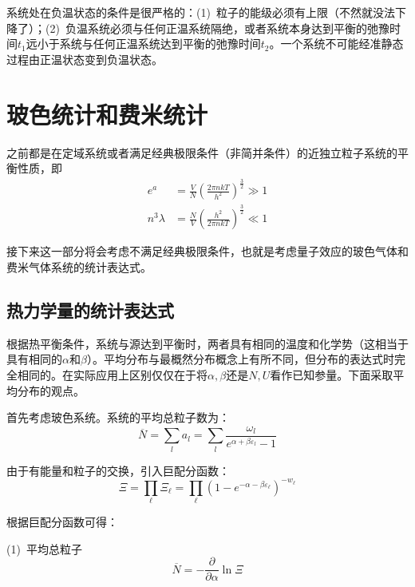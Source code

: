 \documentclass[UTF8]{ctexart}
\begin{document}
	系统处在负温状态的条件是很严格的：(1)\ 粒子的能级必须有上限（不然就没法下降了）；(2)\ 负温系统必须与任何正温系统隔绝，或者系统本身达到平衡的弛豫时间$ t_{1} $远小于系统与任何正温系统达到平衡的弛豫时间$ t_{2} $。一个系统不可能经准静态过程由正温状态变到负温状态。 

	\section{玻色统计和费米统计}
	之前都是在定域系统或者满足经典极限条件（非简并条件）的近独立粒子系统的平衡性质，即
	\begin{equation}
	\begin{aligned}
	e^{a}&=\frac{V}{N}\left(\frac{2 \pi n k T}{h^{2}}\right)^{\frac{3}{2}} \gg 1\\
	n^{3} \lambda& = \frac{N}{V} \left(\frac{h^{2}}{2 \pi n k T}\right)^{\frac{3}{2}} \ll 1
   	\end{aligned}
	\end{equation}

	接下来这一部分将会考虑不满足经典极限条件，也就是考虑量子效应的玻色气体和费米气体系统的统计表达式。

	\subsection{热力学量的统计表达式}
	根据热平衡条件，系统与源达到平衡时，两者具有相同的温度和化学势（这相当于具有相同的$ \alpha $和$ \beta $）。平均分布与最概然分布概念上有所不同，但分布的表达式时完全相同的。在实际应用上区别仅仅在于将$ \alpha,\beta $还是$ N, U $看作已知参量。下面采取平均分布的观点。

	首先考虑玻色系统。系统的平均总粒子数为：
	\begin{equation}
	\overline{N}=\sum_{l} a_{l}= \sum_{l} \frac{\omega_{l}}{e^{\alpha + \beta \varepsilon_{l}}-1} 
	\end{equation}

\noindent 由于有能量和粒子的交换，引入巨配分函数：
	\begin{equation}
 	\Xi =\prod_{\ell} \Xi_{\ell}=\prod_{\ell}\left(1-e^{-\alpha-\beta \varepsilon_{\ell}}\right)^{-w_{\ell}}
	\end{equation}

\noindent 根据巨配分函数可得：

(1)\ 平均总粒子
	\begin{equation}
 	\overline{N}=-\frac{\partial}{\partial \alpha} \ln \Xi
	\end{equation}
\end{document}

